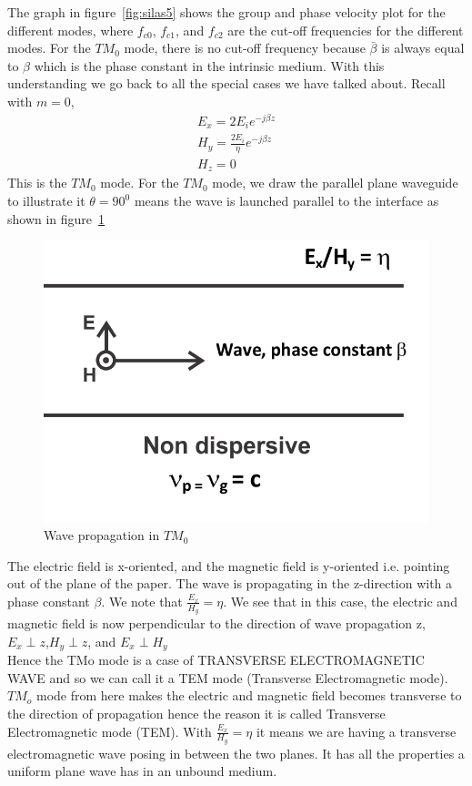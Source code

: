 The graph in figure~\ref{fig:silas5} shows the group and phase velocity plot for the different modes, where $f_{c0}$, $f_{c1}$, and $f_{c2}$ are the cut-off frequencies for the different modes. For the $TM_0$ mode, there is no cut-off frequency because $\bar{\beta}$ is always equal to $\beta$ which is the phase constant in the intrinsic medium. With this understanding we go back to all the special cases we have talked about. Recall with $m = 0$, 
\begin{align*}
E_{x} =2E_{i} e^{-j\beta z}\\
H_{y} = \frac{2E_{i}}{\eta} e^{-j\beta z}\\
H_{z} =0
\end{align*}
This is the $TM_0$ mode. For the $TM_0$ mode, we draw the parallel plane waveguide to illustrate it $\theta =90^{0}$ means the wave is launched parallel to the interface as shown in figure~\ref{fig:silas6}
\begin{figure}[h]
\centering
\includegraphics[width=1\linewidth]{./graphics/silas6}
\caption{Wave propagation in $TM_0$}
\label{fig:silas6}
\end{figure}
The electric field is x-oriented, and the magnetic field is y-oriented i.e. pointing out of the plane of the paper. The wave is propagating in the z-direction with a phase constant $\beta$. We note that $\frac{E_{x}}{H_{y}} = \eta$. We see that in this case, the electric and magnetic field is now perpendicular to the direction of wave propagation z, $E_{x}\perp z$,$H_{y}\perp z$, and $E_{x}\perp H_{y}$\\
Hence the TMo mode is a case of TRANSVERSE ELECTROMAGNETIC WAVE and so we can call it a TEM mode (Transverse Electromagnetic mode). $TM_o$ mode from here makes the electric and magnetic field becomes transverse to the direction of propagation hence the reason it is called Transverse Electromagnetic mode (TEM). With $\frac{E_{x}}{H_{y}} = \eta$ it means we are having a transverse electromagnetic wave posing in between the two planes. It has all the properties a uniform plane wave has in an unbound medium.\\
